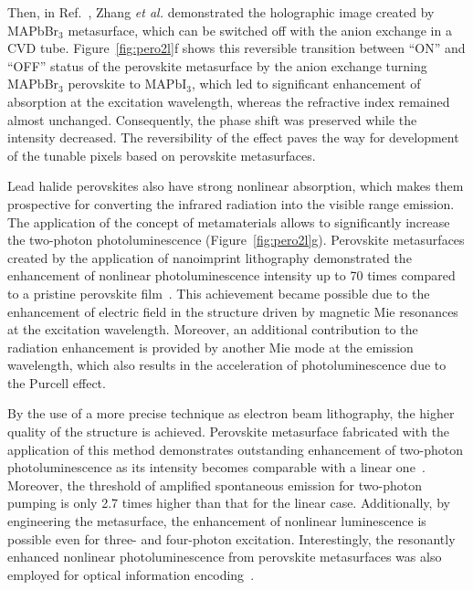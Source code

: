 \documentclass[journal=chreay,manuscript=review]{achemso}
\begin{document}
Then, in Ref.~, Zhang \textit{et al.} demonstrated the holographic image created by MAPbBr$_3$ metasurface, which can be switched off with the anion exchange in a CVD tube. Figure~\ref{fig:pero2l}f shows this reversible transition between “ON” and “OFF” status of the perovskite metasurface by the anion exchange turning MAPbBr$_3$ perovskite to MAPbI$_3$, which led to significant enhancement of absorption at the excitation wavelength, whereas the refractive index remained almost unchanged. Consequently, the phase shift was preserved while the intensity decreased. The reversibility of the effect paves the way for development of the tunable pixels based on perovskite metasurfaces.


Lead halide perovskites also have strong nonlinear absorption\cite{walters2015two,xu2020halide}, which makes them prospective for converting the infrared radiation into the visible range emission. The application of the concept of metamaterials allows to significantly increase the two-photon photoluminescence (Figure~\ref{fig:pero2l}g). Perovskite metasurfaces created by the application of nanoimprint lithography demonstrated the enhancement of nonlinear photoluminescence intensity up to 70 times compared to a pristine perovskite film~\cite{makarov2017multifold}. This achievement became possible due to the enhancement of electric field in the structure driven by magnetic Mie resonances at the excitation wavelength. Moreover, an additional contribution to the radiation enhancement is provided by another Mie mode at the emission wavelength, which also results in the acceleration of photoluminescence due to the Purcell effect. 

By the use of a more precise technique as electron beam lithography, the higher quality of the structure is achieved. Perovskite metasurface fabricated with the application of this method demonstrates outstanding enhancement of two-photon photoluminescence as its intensity becomes comparable with a linear one~\cite{fan2021enhanced}. Moreover, the threshold of amplified spontaneous emission for two-photon pumping is only 2.7 times higher than that for the linear case. Additionally, by engineering the metasurface, the enhancement of nonlinear luminescence is possible even for three- and four-photon excitation. Interestingly, the resonantly enhanced nonlinear photoluminescence from perovskite metasurfaces was also employed for optical information encoding~\cite{fan2019resonance}.
\end{document}
